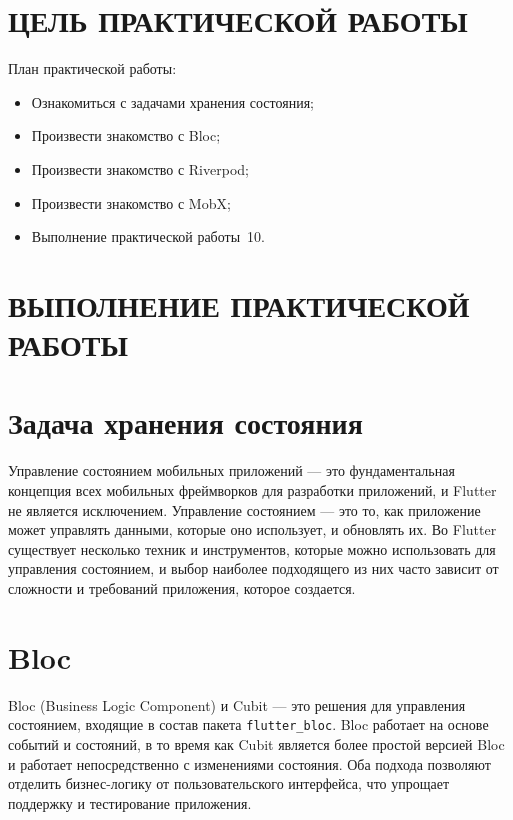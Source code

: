 \section*{ЦЕЛЬ ПРАКТИЧЕСКОЙ РАБОТЫ}

План практической работы:

\begin{itemize}
	\item Ознакомиться с задачами хранения состояния;
	\item Произвести знакомство с Bloc;
	\item Произвести знакомство с Riverpod;
	\item Произвести знакомство с MobX;
	\item Выполнение практической работы \No\,10.
\end{itemize}

\clearpage

\section*{ВЫПОЛНЕНИЕ ПРАКТИЧЕСКОЙ РАБОТЫ}

\section{Задача хранения состояния}

Управление состоянием мобильных приложений --- это фундаментальная концепция
всех мобильных фреймворков для разработки приложений,
и Flutter не является исключением.
Управление состоянием --- это то, как приложение может управлять данными,
которые оно использует, и обновлять их.
Во Flutter существует несколько техник и инструментов,
которые можно использовать для управления состоянием,
и выбор наиболее подходящего из них часто зависит от
сложности и требований приложения, которое создается.

\section{Bloc}

Bloc (Business Logic Component) и Cubit --- это решения
для управления состоянием, входящие в состав пакета \texttt{flutter\_bloc}.
Bloc работает на основе событий и состояний,
в то время как Cubit является более простой версией Bloc
и работает непосредственно с изменениями состояния.
Оба подхода позволяют отделить бизнес-логику от пользовательского интерфейса,
что упрощает поддержку и тестирование приложения.

